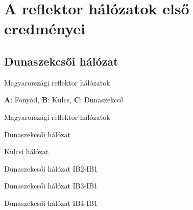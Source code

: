 \documentclass[aspectratio=169]{beamer}
\begin{document}
\section{A reflektor hálózatok első eredményei}


\subsection{Dunaszekcsői hálózat}

\begin{frame}{Magyarországi reflektor hálózatok}
    \centering
    \begin{minipage}[c]{0.7\textwidth}
        \hun
        \begin{center}
            \textbf{A}: Fonyód,
            \textbf{B}: Kulcs,
            \textbf{C}: Dunaszekcső
        \end{center}
    \end{minipage}
\end{frame}


\begin{frame}{Magyarországi reflektor hálózatok}
    \begin{minipage}[c]{0.365\textwidth}
        \centering
        \dszekcso

        Dunaszekcsői hálózat
    \end{minipage}
    \hspace{10pt}
    \begin{minipage}[c]{0.58\textwidth}
        \centering
        \kulcs

        Kulcsi hálózat
    \end{minipage}
\end{frame}




\begin{frame}{Dunaszekcsői hálózat IB2-IB1}
\end{frame}

\begin{frame}{Dunaszekcsői hálózat IB3-IB1}
\end{frame}

\begin{frame}{Dunaszekcsői hálózat IB4-IB1}
\end{frame}
\end{document}
